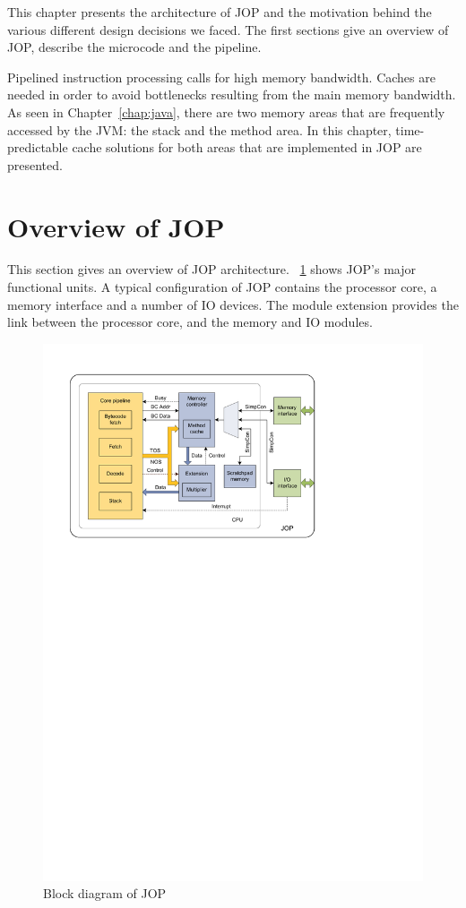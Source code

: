 This chapter presents the architecture of JOP and the motivation
behind the various different design decisions we faced. The first
sections give an overview of JOP, describe the microcode and the
pipeline.

Pipelined instruction processing calls for high memory bandwidth.
Caches are needed in order to avoid bottlenecks resulting from the
main memory bandwidth. As seen in Chapter~\ref{chap:java}, there are
two memory areas that are frequently accessed by the JVM: the stack
and the method area. In this chapter, time-predictable cache
solutions for both areas that are implemented in JOP are presented.

\section{Overview of JOP}

This section gives an overview of JOP architecture.
\figurename~\ref{fig:arch:jop:block} shows JOP's major functional
units. A typical configuration of JOP contains the processor core, a
memory interface and a number of IO devices. The module extension
provides the link between the processor core, and the memory and IO
modules.

\begin{figure}
    \centering
    \includegraphics{arch/arch_jop_block}
    \caption{Block diagram of JOP}
    \label{fig:arch:jop:block}
\end{figure}

